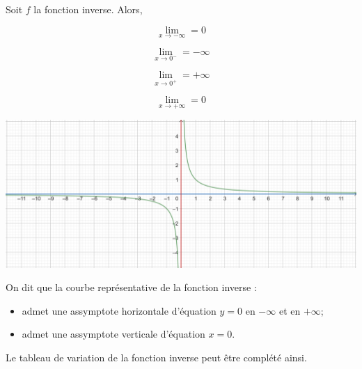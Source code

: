 \documentclass{article}
\begin{document}
\begin{tcolorbox}
\begin{proposition}
Soit $f$ la fonction inverse. Alors,

\begin{minipage}{0.2\textwidth}
\begin{equation*}
\lim_{x \to -\infty} = 0
\end{equation*}
\end{minipage}
\hfill
\begin{minipage}{0.2\textwidth}
\begin{equation*}
\lim_{x \to 0^-} = -\infty
\end{equation*}
\end{minipage}
\hfill
\begin{minipage}{0.2\textwidth}
\begin{equation*}
\lim_{x \to 0^+} = +\infty
\end{equation*}
\end{minipage}
\hfill
\begin{minipage}{0.2\textwidth}
\begin{equation*}
\lim_{x \to +\infty} = 0
\end{equation*}
\end{minipage}
\end{proposition}
\end{tcolorbox}
\begin{center}
\includegraphics[width=\textwidth]{Assymptotes.png}
\end{center}
\begin{definition}
On dit que la courbe représentative de la fonction inverse :
\begin{itemize}
\item admet une assymptote horizontale d'équation $y = 0$ en $-\infty$ et en $+\infty$;
\item admet une assymptote verticale d'équation $x = 0$. 
\end{itemize}
\end{definition}

\begin{remark}
Le tableau de variation de la fonction inverse peut être complété ainsi.
\end{remark}
\begin{center}
\end{center}
    
\end{document}
